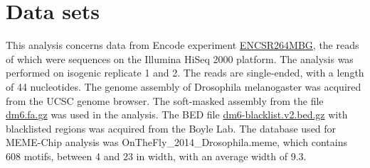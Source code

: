 \documentclass{article}
\begin{document}
\section{Data sets}
This analysis concerns data from Encode experiment \href{https://www.encodeproject.org/experiments/ENCSR264MBG/}{ENCSR264MBG}, the reads of which were sequences on the Illumina HiSeq 2000 platform. The analysis was performed on isogenic replicate 1 and 2. The reads are single-ended, with a length of 44 nucleotides. The genome assembly of Drosophila melanogaster was acquired from the UCSC genome browser\cite{karolchik2003ucsc}. The soft-masked assembly from the file \href{https://hgdownload.soe.ucsc.edu/goldenPath/dm6/bigZips/}{dm6.fa.gz} was used in the analysis. The BED file \href{https://github.com/Boyle-Lab/Blacklist}{dm6-blacklist.v2.bed.gz} with blacklisted regions was acquired from the Boyle Lab\cite{amemiya2019encode}. The database used for MEME-Chip analysis was OnTheFly_2014_Drosophila.meme\cite{shazman2014onthefly}, which contains 608 motifs, between 4 and 23 in width, with an average width of 9.3. 
\end{document}
